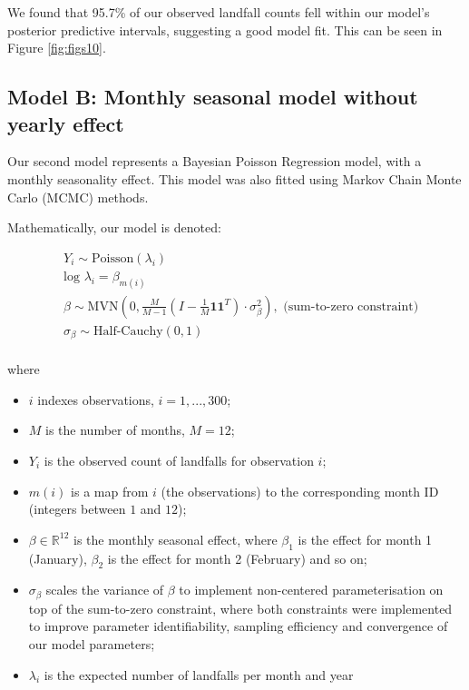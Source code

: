 \documentclass[
]{article}
\providecommand{\tightlist}{%
  \setlength{\itemsep}{0pt}\setlength{\parskip}{0pt}}
\begin{document}
We found that 95.7\% of our observed landfall counts fell within our model's posterior predictive intervals, suggesting a good model fit. This can be seen in Figure \ref{fig:figs10}.

\newpage

\subsection{Model B: Monthly seasonal model without yearly effect}\label{model-b-monthly-seasonal-model-without-yearly-effect}

Our second model represents a Bayesian Poisson Regression model, with a monthly seasonality effect. This model was also fitted using Markov Chain Monte Carlo (MCMC) methods.

Mathematically, our model is denoted:

\begin{align*}
&Y_{i} \sim \text{Poisson}(\lambda_{i})\\
&\text{log } \lambda_{i} =  \beta_{m(i)}\\
&\beta \sim \text{MVN}( 0, \frac{M}{M-1}( I - \frac{1}{M} \mathbf{1}\mathbf{1}^T) \cdot \sigma_{\beta}^2), \text{  (sum-to-zero constraint)}\\
&\sigma_{\beta} \sim \text{Half-Cauchy}(0,1)\\
\end{align*}

where

\begin{itemize}
\tightlist
\item
  \(i\) indexes observations, \(i=1,...,300\);
\item
  \(M\) is the number of months, \(M = 12\);
\item
  \(Y_{i}\) is the observed count of landfalls for observation \(i\);
\item
  \(m(i)\) is a map from \(i\) (the observations) to the corresponding month ID (integers between \(1\) and \(12\));
\item
  \(\beta \in \mathbb{R}^{12}\) is the monthly seasonal effect, where \(\beta_1\) is the effect for month 1 (January), \(\beta_2\) is the effect for month 2 (February) and so on;
\item
  \(\sigma_{\beta}\) scales the variance of \(\beta\) to implement non-centered parameterisation on top of the sum-to-zero constraint, where both constraints were implemented to improve parameter identifiability, sampling efficiency and convergence of our model parameters;
\item
  \(\lambda_{i}\) is the expected number of landfalls per month and year
\end{itemize}
\end{document}
